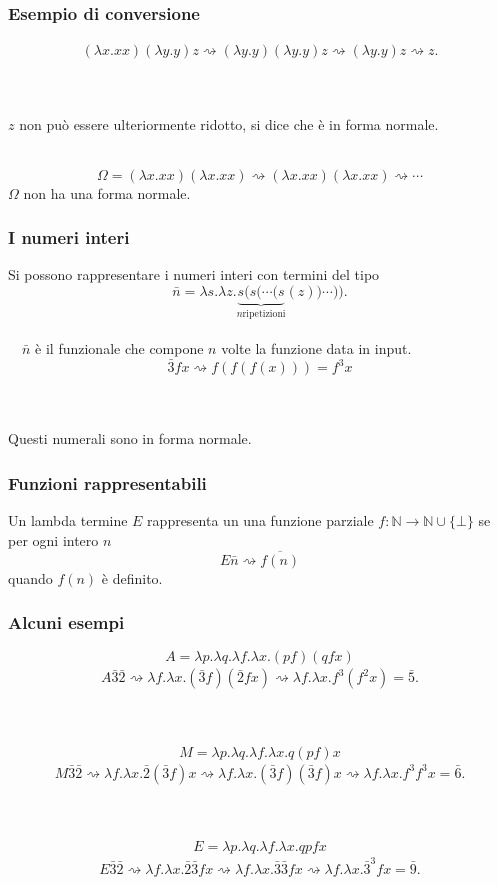 \documentclass{beamer}
\renewcommand{\l}{\lambda}
\newcommand{\conv}{\rightsquigarrow}
\begin{document}
\begin{frame}
    \frametitle{Esempio di conversione}
    \begin{align*}
        (\l x.xx)(\l y.y)z \conv (\l y.y)(\l y.y)z 
        \conv (\l y.y)z \conv z.
    \end{align*}
    \\~\

    $z$ non pu\`o essere ulteriormente ridotto, si dice che \`e in forma
    normale.
    \\~\

    \[
        \Omega = (\l x.xx)(\l x.xx) \conv (\l x.xx)(\l x.xx) \conv\cdots
    \]
    $\Omega$ non ha una forma normale.
\end{frame}

\begin{frame}
    \frametitle{I numeri interi}

    Si possono rappresentare i numeri interi con termini del tipo
    \[
        \bar{n} = \l s. \l z. \underbrace{s ( s ( \cdots (s}_{n\text{
            ripetizioni}} (z))\cdots )).
    \]
    \\~\
    $\bar{n}$ \`e il funzionale che compone $n$ volte la funzione data in input.
    \[
        \bar{3} f x \conv f(f(f(x))) = f^3x
    \]
    \\~\

    Questi numerali sono in forma normale.
\end{frame}

\begin{frame}
    \frametitle{Funzioni rappresentabili}

    Un lambda termine $E$ rappresenta un una funzione parziale ${f\colon
    \mathbb{N}\rightarrow \mathbb{N}\cup \{\bot\} }$ se per ogni intero $n$
    \[
        E\bar{n}\conv \overline{f(n)}
    \]
    quando $f(n)$ \`e definito.
\end{frame}

\begin{frame}
    \frametitle{Alcuni esempi} 

    \[
        A = \l p. \l q. \l f. \l x. (pf)(qfx)
    \]
    \begin{align*}
        A \bar{3} \bar{2} \conv \l f. \l x. (\bar{3}f)(\bar{2}fx)
        \conv \l f. \l x. f^3(f^2x) = \bar{5}.
    \end{align*}
    \\~\

    \[
        M = \l p. \l q. \l f. \l x. q(pf)x
    \]
    \begin{align*}
        M \bar{3} \bar{2} \conv \l f. \l x. \bar{2} (\bar{3}f)x
        \conv \l f. \l x. (\bar{3}f)(\bar{3}f)x \conv \l f. \l x.f^3f^3x =
        \bar{6}.
    \end{align*}
    \\~\

    \[
        E = \l p. \l q. \l f. \l x. qpfx
    \]
    \begin{align*}
        E \bar{3} \bar{2} \conv \l f. \l x. \bar{2} \bar{3}fx
        \conv \l f. \l x. \bar{3}\bar{3}fx \conv \l f. \l x. \bar{3}^3 fx =
        \bar{9}.
    \end{align*}
\end{frame}
\end{document}
